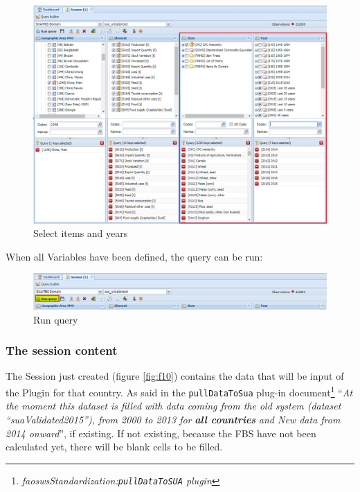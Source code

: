 \documentclass[]{article}
\let\rmarkdownfootnote\footnote%
\def\footnote{\protect\rmarkdownfootnote}
\begin{document}
\begin{figure}[H]

{\centering \includegraphics[width=1\linewidth]{images/standPlugin/08_selectItemYear} 

}

\caption{\label{fig:f8}Select items and years}\label{fig:f8}
\end{figure}

When all Variables have been defined, the query can be run:

\begin{figure}[H]

{\centering \includegraphics[width=1\linewidth]{images/standPlugin/09_run} 

}

\caption{\label{fig:f9}Run query}\label{fig:f9}
\end{figure}

\subsubsection{The session content}\label{the-session-content}

The Session just created (figure \ref{fig:f10}) contains the data that
will be input of the Plugin for that country. As said in the
\texttt{pullDataToSua} plug-in document\footnote{\emph{faoswsStandardization:\texttt{pullDataToSUA}
  plugin}} ``\emph{At the moment this dataset is filled with data coming
from the old system (dataset ``suaValidated2015''), from 2000 to 2013
for} \textbf{\emph{all countries}} \emph{and New data from 2014
onward}'', if existing. If not existing, because the FBS have not been
calculated yet, there will be blank cells to be filled.
\end{document}
